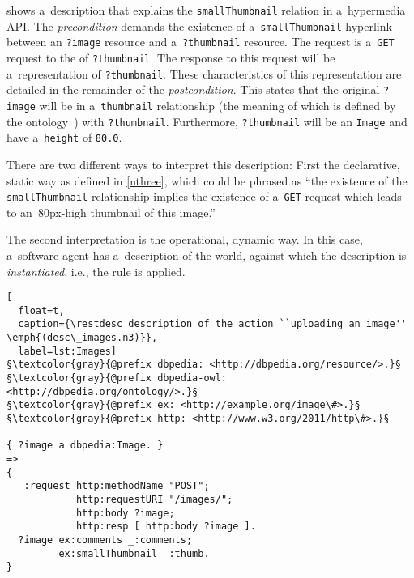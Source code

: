  shows a~description
that explains the \verb!smallThumbnail! relation in a~hypermedia API.
The \emph{precondition} demands the existence of
a~\verb!smallThumbnail! hyperlink
between an \verb!?image! resource
and a~\verb!?thumbnail! resource.
The \http request
is a~\verb!GET! request to the \URL of \verb!?thumbnail!.
The response to this request will be a~representation of \verb!?thumbnail!.
These characteristics of this representation are detailed in the remainder of the \emph{postcondition}.
This states that the original \verb!?image!
will be in a~\verb!thumbnail! relationship
(the meaning of which is defined by the \dbpedia ontology~\cite{DBpedia})
with \verb!?thumbnail!.
Furthermore, \verb!?thumbnail! will be an \verb!Image!
and have a~\verb!height! of \verb!80.0!.

There are two different ways to interpret this description:
First the declarative, static way as defined in \cref{nthree},
which could be phrased as
\enquote{the existence of the \texttt{smallThumbnail} relationship
implies the existence of a~\texttt{GET} request
which leads to an~80px-high thumbnail of this image.}

The second interpretation is the operational, dynamic way.
In this case, a~software agent has a~description of the world,
against which the description is \emph{instantiated},
i.e., the rule is applied.

\begin{lstlisting}[
  float=t,
  caption={\restdesc description of the action ``uploading an image'' \emph{(desc\_images.n3)}},
  label=lst:Images]
§\textcolor{gray}{@prefix dbpedia: <http://dbpedia.org/resource/>.}§
§\textcolor{gray}{@prefix dbpedia-owl: <http://dbpedia.org/ontology/>.}§
§\textcolor{gray}{@prefix ex: <http://example.org/image\#>.}§
§\textcolor{gray}{@prefix http: <http://www.w3.org/2011/http\#>.}§

{ ?image a dbpedia:Image. }
=>
{
  _:request http:methodName "POST";
            http:requestURI "/images/";
            http:body ?image;
            http:resp [ http:body ?image ].
  ?image ex:comments _:comments;
         ex:smallThumbnail _:thumb.
}
\end{lstlisting}


